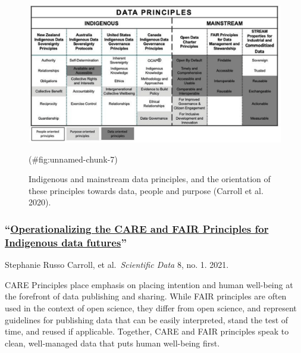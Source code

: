 \documentclass[
]{book}
\begin{document}
\begin{figure}
\includegraphics[width=18.39in]{images/care} \caption{Indigenous and mainstream data principles, and the orientation of these principles towards data, people and purpose (Carroll et al. 2020).}(\#fig:unnamed-chunk-7)
\end{figure}

\hypertarget{operationalizing-the-care-and-fair-principles-for-indigenous-data-futures}{%
\subsubsection*{\texorpdfstring{``\href{https://doi.org/10.1038/s41597-021-00892-0}{Operationalizing the CARE and FAIR Principles for Indigenous data futures}''}{``Operationalizing the CARE and FAIR Principles for Indigenous data futures''}}\label{operationalizing-the-care-and-fair-principles-for-indigenous-data-futures}}

Stephanie Russo Carroll, et al.~\emph{Scientific Data} 8, no. 1. 2021.

CARE Principles place emphasis on placing intention and human well-being at the forefront of data publishing and sharing. While FAIR principles are often used in the context of open science, they differ from open science, and represent guidelines for publishing data that can be easily interpreted, stand the test of time, and reused if applicable. Together, CARE and FAIR principles speak to clean, well-managed data that puts human well-being first.
\end{document}
